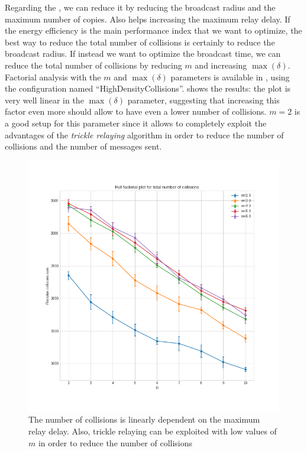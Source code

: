 Regarding the , we can reduce it by
reducing the broadcast radius and the maximum number of copies. Also helps
increasing the maximum relay delay. If the energy efficiency is the main
performance index that we want to optimize, the best way to reduce the total
number of collisions is certainly to reduce the broadcast radius. If instead we
want to optimize the broadcast time, we can reduce the total number of
collisions by reducing \(m\) and increasing \(\max(\delta)\). Factorial
analysis with the \(m\) and \(\max(\delta)\) parameters is available in
, using the configuration named
``HighDensityCollisions''.  shows the results: the
plot is very well linear in the \(\max(\delta)\) parameter, suggesting that
increasing this factor even more should allow to have even a lower number of
collisions. \(m\!=\!2\) is a good setup for this parameter since it allows to
completely exploit the advantages of the \emph{trickle relaying} algorithm in
order to reduce the number of collisions and the number of messages sent.

\begin{figure}
	\centering
	\includegraphics[width=\textwidth]{img/hd/collisions-D-ffplot}
	\caption{The number of collisions is linearly dependent on the maximum
	relay delay. Also, trickle relaying can be exploited with low values of
	\(m\) in order to reduce the number of
	collisions}\label{fig:hdcollisionsff}
\end{figure}

